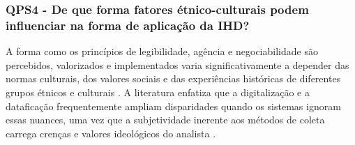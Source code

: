 \documentclass[
	12pt,				%
	oneside,			%
	a4paper,			%
	english,			%
	brazil				%
	]{abntex2ppgsi}
\begin{document}



    \subsubsection{QPS4 - De que forma fatores étnico-culturais podem influenciar na forma de aplicação da IHD?}

    A forma como os princípios de legibilidade, agência e negociabilidade são percebidos, valorizados e implementados varia significativamente a depender das normas culturais, dos valores sociais e das experiências históricas de diferentes grupos étnicos e culturais \cite{Coleti2024, Victorelli2024Adopting, durango2024data, Kurze2023, Roberts2023, Elhamdadi2022, Locoro2020, VICTORELLI2020Understanding}. A literatura enfatiza que a digitalização e a dataficação frequentemente ampliam disparidades quando os sistemas ignoram essas nuances, uma vez que a subjetividade inerente aos métodos de coleta carrega crenças e valores ideológicos do analista \cite{Refat2023, Nelson2023, Hayes2022, Briggs2021, Hornung2015}. 
\end{document}
